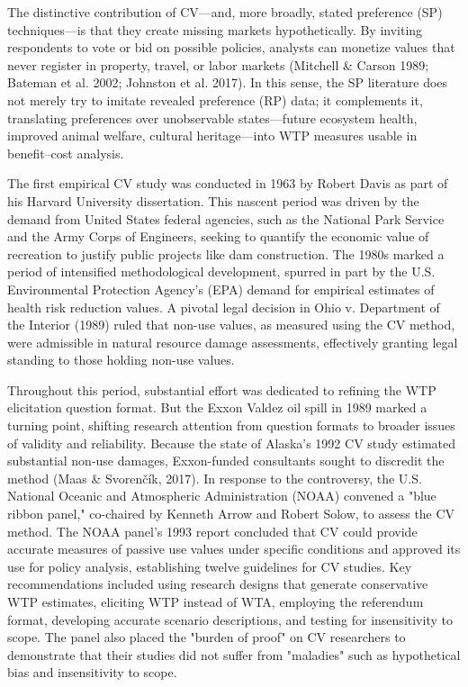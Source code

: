 \documentclass[12pt]{article}
\begin{document}
The distinctive contribution of CV—and, more broadly, stated preference (SP) techniques—is that they create missing markets hypothetically. By inviting respondents to vote or bid on possible policies, analysts can monetize values that never register in property, travel, or labor markets (Mitchell \& Carson 1989; Bateman et al. 2002; Johnston et al. 2017). In this sense, the SP literature does not merely try to imitate revealed preference (RP) data; it complements it, translating preferences over unobservable states—future ecosystem health, improved animal welfare, cultural heritage—into WTP measures usable in benefit–cost analysis.

The first empirical CV study was conducted in 1963 by Robert Davis as part of his Harvard University dissertation. This nascent period was driven by the demand from United States federal agencies, such as the National Park Service and the Army Corps of Engineers, seeking to quantify the economic value of recreation to justify public projects like dam construction. The 1980s marked a period of intensified methodological development, spurred in part by the U.S. Environmental Protection Agency’s (EPA) demand for empirical estimates of health risk reduction values. A pivotal legal decision in Ohio v. Department of the Interior (1989) ruled that non-use values, as measured using the CV method, were admissible in natural resource damage assessments, effectively granting legal standing to those holding non-use values. 

Throughout this period, substantial effort was dedicated to refining the WTP elicitation question format. But the Exxon Valdez oil spill in 1989 marked a turning point, shifting research attention from question formats to broader issues of validity and reliability. Because the state of Alaska’s 1992 CV study estimated substantial non-use damages, Exxon-funded consultants sought to discredit the method (Maas \& Svorenčík, 2017). In response to the controversy, the U.S. National Oceanic and Atmospheric Administration (NOAA) convened a "blue ribbon panel," co-chaired by Kenneth Arrow and Robert Solow, to assess the CV method. The NOAA panel's 1993 report concluded that CV could provide accurate measures of passive use values under specific conditions and approved its use for policy analysis, establishing twelve guidelines for CV studies. Key recommendations included using research designs that generate conservative WTP estimates, eliciting WTP instead of WTA, employing the referendum format, developing accurate scenario descriptions, and testing for insensitivity to scope. The panel also placed the "burden of proof" on CV researchers to demonstrate that their studies did not suffer from "maladies" such as hypothetical bias and insensitivity to scope.
\end{document}
